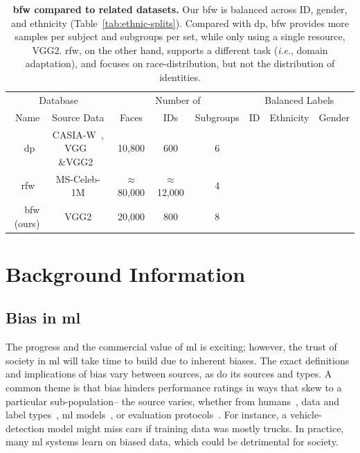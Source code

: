 \documentclass[10pt,twocolumn,letterpaper]{article}
\newcommand{\ie}{\textit{i}.\textit{e}., }
\newcommand{\xmark}{\ding{56}}%
\newcommand{\checkc}{\ding{51}}%
\begin{document}
    \begin{table}[t!]
        
        \centering
        \caption{\textbf{\gls{bfw} compared to related datasets.} Our \gls{bfw} is balanced across ID, gender, and ethnicity (Table~\ref{tab:ethnic-splits}). Compared with \gls{dp}, \gls{bfw} provides more samples per subject and subgroups per set, while only using a single resource, VGG2. \gls{rfw}, on the other hand, supports a different task (\ie domain adaptation), and focuses on race-distribution, but not the distribution of identities.}
        \scriptsize
        \begin{tabular}{rccccccc}%
        
            \multicolumn{2}{c}{Database} & \multicolumn{3}{c}{Number of}& \multicolumn{3}{c}{Balanced Labels}\\
            \cmidrule(lr){1-2}	\cmidrule(lr){3-5} \cmidrule(lr){6-8}
            Name & Source Data & Faces &  IDs & Subgroups & ID & Ethnicity & Gender\\\midrule
            \gls{dp}~\cite{demogPairs}     & CASIA-W~\cite{yi2014learning}, VGG~\cite{schroff2015facenet} \&VGG2~\cite{Cao18} & 10,800& 600 & 6 &\checkc& \checkc &\checkc \\
            \gls{rfw}~\cite{wang2018racial}     &  MS-Celeb-1M &$\approx$80,000&$\approx$12,000& 4 & \xmark & \checkc &\xmark \\
            \gls{bfw} (ours) & VGG2 & 20,000 & 800 &8 & \checkc & \checkc &\checkc \\\bottomrule
        \end{tabular}
        \label{tab:compared}
    \end{table}
    
\section{Background Information}
    \subsection{Bias in \gls{ml}}
        The progress and the commercial value of \gls{ml} is exciting; however, the trust of society in \gls{ml} will take time to build due to inherent biases. The exact definitions and implications of bias vary between sources, as do its sources and types. A common theme is that bias hinders performance ratings in ways that skew to a particular sub-population-- the source varies, whether from humans~\cite{windmann1998subconscious}, data and label types~\cite{tommasi2017deeper}, \gls{ml} models~\cite{amini2019uncovering, kim2019learning}, or evaluation protocols~\cite{stock2018convnets}. For instance, a vehicle-detection model might miss cars if training data was mostly trucks. In practice, many \gls{ml} systems learn on biased data, which could be detrimental for society. 
\end{document}
